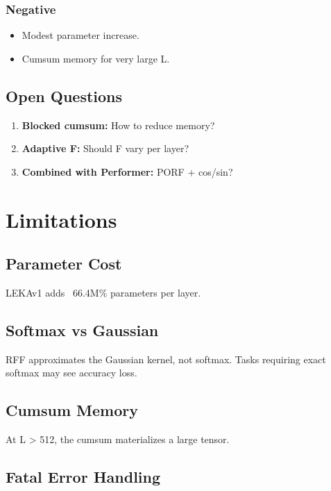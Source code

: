 \subsubsection{Negative}
\begin{itemize}
\item Modest parameter increase.
\item Cumsum memory for very large L.

\end{itemize}
\subsection{Open Questions}

\begin{enumerate}
\item \textbf{Blocked cumsum:} How to reduce memory?
\item \textbf{Adaptive F:} Should F vary per layer?
\item \textbf{Combined with Performer:} PORF + cos/sin?

\end{enumerate}


\section{Limitations}

\subsection{Parameter Cost}

LEKAv1 adds ~66.4M\% parameters per layer.

\subsection{Softmax vs Gaussian}

RFF approximates the Gaussian kernel, not softmax. Tasks requiring exact 
softmax may see accuracy loss.

\subsection{Cumsum Memory}

At L > 512, the cumsum materializes a large tensor.

\subsection{Fatal Error Handling}

